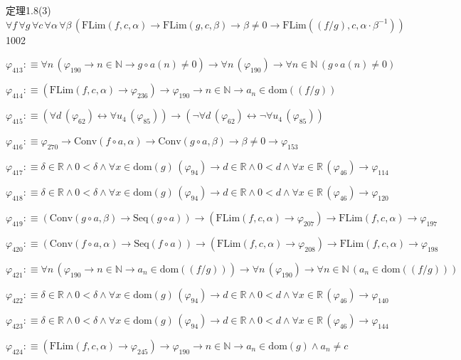 \begin{fullproof}{定理1.8(3)}{$\forall f\,\forall g\,\forall c\,\forall \alpha\,\forall \beta\,(\mathrm{FLim}(f,c,\alpha) \to \mathrm{FLim}(g,c,\beta) \to \beta \neq 0 \to \mathrm{FLim}((f / g),c,\alpha \cdot \beta^{-1}))$}{1002}
\begin{abbrevlist}
\item $\varphi_{413} :\equiv \forall n\,(\varphi_{190} \to n \in \mathbb{N} \to g \circ a(n) \neq 0) \to \forall n\,(\varphi_{190}) \to \forall n \in \mathbb{N}\,(g \circ a(n) \neq 0)$
\item $\varphi_{414} :\equiv (\mathrm{FLim}(f,c,\alpha) \to \varphi_{236}) \to \varphi_{190} \to n \in \mathbb{N} \to a_{n} \in \mathrm{dom}((f / g))$
\item $\varphi_{415} :\equiv (\forall d\,(\varphi_{62}) \leftrightarrow \forall u_{4}\,(\varphi_{85})) \to (\neg \forall d\,(\varphi_{62}) \leftrightarrow \neg \forall u_{4}\,(\varphi_{85}))$
\item $\varphi_{416} :\equiv \varphi_{270} \to \mathrm{Conv}(f \circ a,\alpha) \to \mathrm{Conv}(g \circ a,\beta) \to \beta \neq 0 \to \varphi_{153}$
\item $\varphi_{417} :\equiv \delta \in \mathbb{R} \land 0 < \delta \land \forall x \in \mathrm{dom}(g)\,(\varphi_{94}) \to d \in \mathbb{R} \land 0 < d \land \forall x \in \mathbb{R}\,(\varphi_{46}) \to \varphi_{114}$
\item $\varphi_{418} :\equiv \delta \in \mathbb{R} \land 0 < \delta \land \forall x \in \mathrm{dom}(g)\,(\varphi_{94}) \to d \in \mathbb{R} \land 0 < d \land \forall x \in \mathbb{R}\,(\varphi_{46}) \to \varphi_{120}$
\item $\varphi_{419} :\equiv (\mathrm{Conv}(g \circ a,\beta) \to \mathrm{Seq}(g \circ a)) \to (\mathrm{FLim}(f,c,\alpha) \to \varphi_{207}) \to \mathrm{FLim}(f,c,\alpha) \to \varphi_{197}$
\item $\varphi_{420} :\equiv (\mathrm{Conv}(f \circ a,\alpha) \to \mathrm{Seq}(f \circ a)) \to (\mathrm{FLim}(f,c,\alpha) \to \varphi_{208}) \to \mathrm{FLim}(f,c,\alpha) \to \varphi_{198}$
\item $\varphi_{421} :\equiv \forall n\,(\varphi_{190} \to n \in \mathbb{N} \to a_{n} \in \mathrm{dom}((f / g))) \to \forall n\,(\varphi_{190}) \to \forall n \in \mathbb{N}\,(a_{n} \in \mathrm{dom}((f / g)))$
\item $\varphi_{422} :\equiv \delta \in \mathbb{R} \land 0 < \delta \land \forall x \in \mathrm{dom}(g)\,(\varphi_{94}) \to d \in \mathbb{R} \land 0 < d \land \forall x \in \mathbb{R}\,(\varphi_{46}) \to \varphi_{140}$
\item $\varphi_{423} :\equiv \delta \in \mathbb{R} \land 0 < \delta \land \forall x \in \mathrm{dom}(g)\,(\varphi_{94}) \to d \in \mathbb{R} \land 0 < d \land \forall x \in \mathbb{R}\,(\varphi_{46}) \to \varphi_{144}$
\item $\varphi_{424} :\equiv (\mathrm{FLim}(f,c,\alpha) \to \varphi_{245}) \to \varphi_{190} \to n \in \mathbb{N} \to a_{n} \in \mathrm{dom}(g) \land a_{n} \neq c$

\end{abbrevlist}
\end{fullproof}
